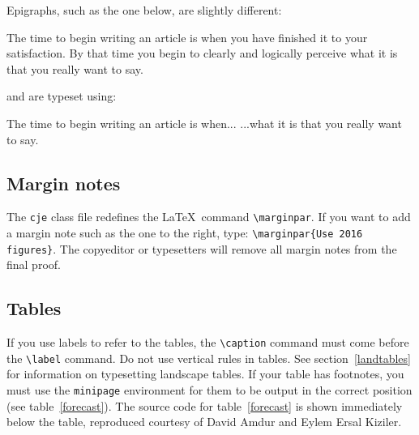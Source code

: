 \documentclass{cje}          %
\theoremstyle{plain}%
\theoremstyle{definition}
\theoremstyle{remark}
\begin{document}
Epigraphs, such as the one below, are slightly different:
\begin{epigraph}
The time to begin writing an article is when you have finished it to your satisfaction. By that time you begin to clearly and logically perceive what it is that you really want to say.
\end{epigraph}
and are typeset using:
\begin{smallverbatim}
\begin{epigraph}
The time to begin writing an article is when...
  ...what it is that you really want to say.
\end{epigraph}
\end{smallverbatim}

\subsection{Margin notes}

The \texttt{cje} class file redefines the \LaTeX\ command \verb"\marginpar". If you want to add a margin note such as the one to the right, type: \verb"\marginpar{Use 2016 figures}". The copyeditor or typesetters will remove all margin notes from the final proof.

\subsection{Tables}

If you use labels to refer to the tables, the \verb"\caption" command must come before the \verb"\label" command. Do not use vertical rules in tables. See section~\ref{landtables} for information on typesetting landscape tables. If your table has footnotes, you must use the \texttt{minipage} environment for them to be output in the correct position (see table~\ref{forecast}). The source code for table~\ref{forecast} is shown immediately below the table, reproduced courtesy of David Amdur and Eylem Ersal Kiziler. 
\end{document}
